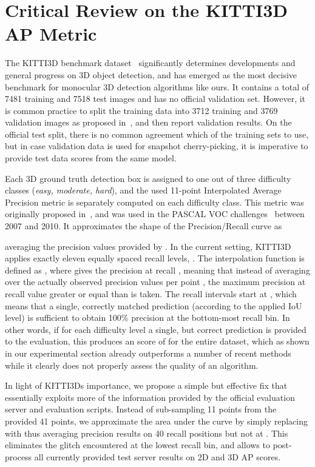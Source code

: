 \documentclass[10pt,twocolumn,letterpaper]{article}
\begin{document}
\section{Critical Review on the KITTI3D AP Metric}
\label{sec:metric}

The KITTI3D benchmark dataset~\cite{Geiger2012CVPR} significantly determines developments and general progress on 3D object detection, and has emerged as the most decisive benchmark for monocular 3D detection algorithms like ours. It contains a total of 7481 training and 7518 test images and has no official validation set. However, it is common practice to split the training data into 3712 training and 3769 validation images as proposed in~\cite{NIPS2015_Chen}, and then report validation results. On the official test split, there is no common agreement which of the training sets to use, but in case validation data is used for snapshot cherry-picking, it is imperative to provide test data scores from the same model. 

Each 3D ground truth detection box is assigned to one out of three difficulty classes (\textit{easy, moderate, hard}), and the used 11-point Interpolated Average Precision metric is separately computed on each difficulty class. This metric was originally proposed in~\cite{Salton1986}, and was used in the PASCAL VOC challenges~\cite{Everingham2010} between 2007 and 2010. It approximates the shape of the Precision/Recall curve as

averaging the precision values provided by . In the current setting, KITTI3D applies exactly eleven equally spaced recall levels, \ie . The interpolation function is defined as , where  gives the precision at recall , meaning that instead of averaging over the actually observed precision values per point , the maximum precision at recall value greater or equal than  is taken. The recall intervals start at , which means that a single, correctly matched prediction (according to the applied IoU level) is sufficient to obtain 100\% precision at the bottom-most recall bin. In other words, if for each difficulty level a single, but correct prediction is provided to the evaluation, this produces an  score of  for the entire dataset, which as shown in our experimental section already outperforms a number of recent methods while it clearly does not properly assess the quality of an algorithm.

In light of KITTI3Ds importance, we propose a simple but effective fix that essentially exploits more of the information provided by the official evaluation server and evaluation scripts. Instead of sub-sampling 11 points from the provided 41 points, we approximate the area under the curve by simply replacing  with  thus averaging precision results on 40 recall positions but not at . This eliminates the glitch encountered at the lowest recall bin, and allows to post-process all currently provided test server results on 2D and 3D AP scores.
\end{document}
